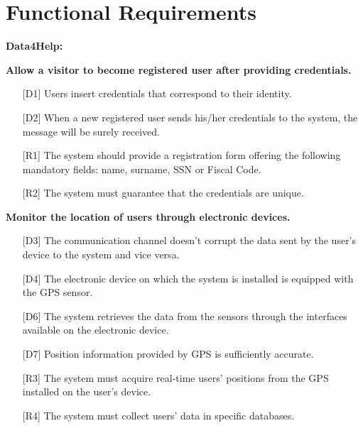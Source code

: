 \section{Functional Requirements}
\textbf{Data4Help:}  
\begin{enumerate} [label={\bf[G\arabic*]}]
    \item \textbf{Allow a visitor to become registered user after providing credentials.}
        \begin{itemize}
            \item [{[D1]}] Users insert credentials that correspond to their identity.
            \item [{[D2]}] When a new registered user sends his/her credentials to the system, the message will be surely received.
            \item [{[R1]}] The system should provide a registration form offering the following mandatory fields: name, surname, SSN or Fiscal Code.
            \item [{[R2]}] The system must guarantee that the credentials are unique.
        \end{itemize}
        
    \item \textbf{Monitor the location of users through electronic devices.}
        \begin{itemize}
            \item [{[D3]}] The communication channel doesn't corrupt the data sent by the user's device to the system and vice versa.
            \item [{[D4]}] The electronic device on which the system is installed is equipped with the GPS sensor.
            \item [{[D6]}] The  system  retrieves  the  data  from  the  sensors through the interfaces available on the electronic device.
            \item [{[D7]}] Position information provided by GPS is sufficiently accurate.
            \item [{[R3]}] The system must acquire real-time users' positions from the GPS installed on the user's device.
            \item [{[R4]}] The system must collect users' data in specific databases.
        \end{itemize}
        

\end{enumerate}
